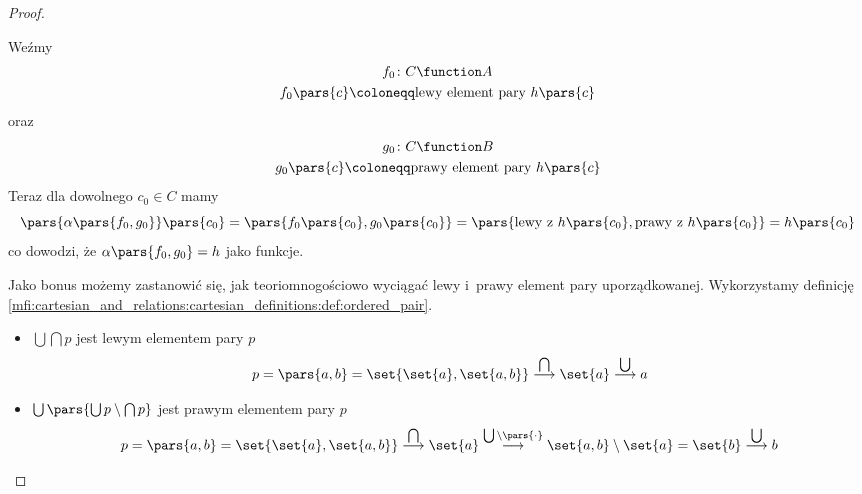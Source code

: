\begin{proof}
\begin{description}
		      Weźmy
		      \begin{gather*}
			      f_0\colon C \function A\\
			      f_0\pars{c} \coloneqq \text{lewy element pary \(h\pars{c}\)}
		      \end{gather*}
		      oraz
		      \begin{gather*}
			      g_0\colon C \function B\\
			      g_0\pars{c} \coloneqq \text{prawy element pary \(h\pars{c}\)}
		      \end{gather*}
		      Teraz dla dowolnego \(c_0 \in C\) mamy
		      \begin{equation*}
			      \pars{\alpha\pars{f_0, g_0}}\pars{c_0}
			      = \pars{f_0\pars{c_0}, g_0\pars{c_0}}
			      = \pars{\text{lewy z~\(h\pars{c_0}\)}, \text{prawy z~\(h\pars{c_0}\)}}
			      = h\pars{c_0}
		      \end{equation*}
		      co dowodzi, że \(\alpha\pars{f_0, g_0} = h\) jako funkcje.

		      Jako bonus możemy zastanowić się, jak teoriomnogościowo wyciągać lewy i~prawy element pary uporządkowanej. Wykorzystamy definicję \ref{mfi:cartesian_and_relations:cartesian_definitions:def:ordered_pair}.
		      \begin{itemize}
			      \item \(\bigcup\bigcap p\) jest lewym elementem pary \(p\)
			            \begin{equation*}
				            p = \pars{a, b} = \set{\set{a}, \set{a, b}} \overset{\bigcap}{\longrightarrow} \set{a} \overset{\bigcup}{\longrightarrow} a
			            \end{equation*}
			      \item \(\bigcup\pars{\bigcup p \setminus \bigcap p}\) jest prawym elementem pary \(p\)
			            \begin{equation*}
				            p = \pars{a, b} = \set{\set{a}, \set{a, b}} \overset{\bigcap}{\longrightarrow} \set{a} \overset{\bigcup \setminus \pars{\mathord{\cdot}}}{\longrightarrow} \set{a, b} \setminus \set{a} = \set{b} \overset{\bigcup}{\longrightarrow} b
			            \end{equation*}
		      \end{itemize}
	\end{description}
\end{proof}
